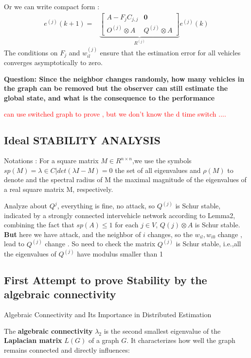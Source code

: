 \documentclass[letterpaper, 10pt, conference]{ieeeconf}  %
\begin{document}
Or we can write compact form : 
$$
\begin{aligned}
e^{(j)}(k+1)= & \underbrace{\left[\begin{array}{c|c}
A-F_j C_{j, j} & \mathbf{0} \\
\hline O^{(j)} \otimes A & Q^{(j)} \otimes A
\end{array}\right]}_{R^{(j)}} e^{(j)}(k) 
\end{aligned}
$$
The conditions on \( F_j \) and \( w_{il}^{(j)} \) ensure that the estimation error for all vehicles converges asymptotically to zero.

\textbf{Question: Since the neighbor changes randomly, how many vehicles in the graph can be removed but the observer can still estimate the global state, and what is the consequence to the performance} 

\textcolor{red}{ can use switched graph to prove , but we don't know the  d time switch}
\textcolor{red}{....}

\subsection{Ideal STABILITY ANALYSIS}
Notations : For a square matrix $M \in R^{n\times n}$,we use the symbols $sp(M)={\lambda \in C|det (\lambda I - M ) = 0}$ the set of all eigenvalues and $ \rho(M)$ to denote and the spectral radius of M the maximal magnitude of the eigenvalues of a real square matrix M, respectively.

Analyze about $Q^{j}$, everything is fine, no attack, so $ Q^{(j)}$ is Schur stable, indicated by a strongly connected intervehicle network according to Lemma2, combining the fact that $sp(A) \leq 1 $ for each $j \in V$, $Q(j) \otimes A$ is Schur stable. 
\\ 

\textbf{But} here we have attack, and the neighbor of $i$ changes, so the $ w_{il} , w_{i 0}$ change , lead to $Q^{(j)}$ change . So need to check the matrix $Q^{(j)}$ is Schur stable, i.e.,all the eigenvalues of $Q^{(j)}$ have modulus smaller than 1

 \subsection{First Attempt to prove Stability by the algebraic connectivity  }
Algebraic Connectivity and Its Importance in Distributed Estimation \cite{algebraic_connectivity}

The \textbf{algebraic connectivity} \( \lambda_2 \) is the second smallest eigenvalue of the \textbf{Laplacian matrix} \( L(G) \) of a graph \( G \). It characterizes how well the graph remains connected and directly influences:
\end{document}
